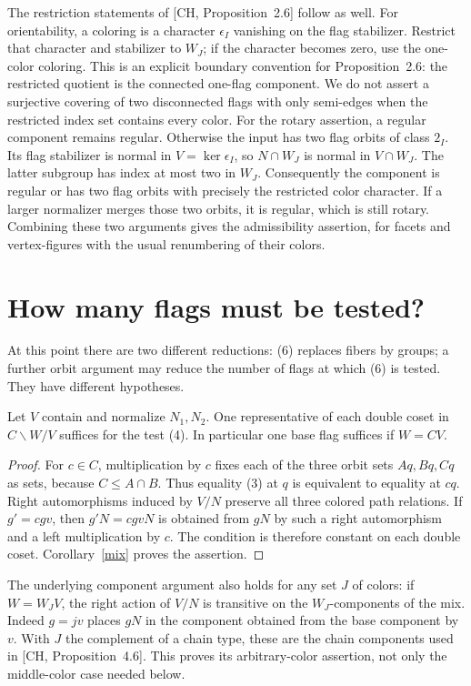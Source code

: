 \documentclass[a4paper,11pt]{article}
\begin{document}
The restriction statements of [CH, Proposition~2.6] follow as well.
For orientability, a coloring is a character $\epsilon_I$ vanishing on
the flag stabilizer. Restrict that character and stabilizer to $W_J$;
if the character becomes zero, use the one-color coloring. This is an
explicit boundary convention for Proposition~2.6: the restricted quotient
is the connected one-flag component. We do not assert a surjective covering
of two disconnected flags with only semi-edges when the restricted index
set contains every color. For the rotary assertion, a regular component remains regular. Otherwise the
input has two flag orbits of class $2_I$. Its flag stabilizer is normal
in $V=\ker\epsilon_I$, so $N\cap W_J$ is normal in $V\cap W_J$.
The latter subgroup has index at most two in $W_J$. Consequently the
component is regular or has two flag orbits with precisely the restricted
color character. If a larger normalizer merges those two orbits, it is
regular, which is still rotary. Combining these two arguments gives the
admissibility assertion, for facets and vertex-figures with the usual
renumbering of their colors.

\section{How many flags must be tested?}
At this point there are two different reductions: (6) replaces fibers
by groups; a further orbit argument may reduce the number of flags at
which (6) is tested. They have different hypotheses.

\begin{proposition}\label{orbit}
Let $V$ contain and normalize $N_1,N_2$. One representative of each
double coset in $C\backslash W/V$ suffices for the test (4).
In particular one base flag suffices if $W=CV$.
\end{proposition}
\begin{proof}
For $c\in C$, multiplication by $c$ fixes each of the three orbit sets
$Aq,Bq,Cq$ as sets, because $C\leq A\cap B$. Thus equality (3) at
$q$ is equivalent to equality at $cq$. Right automorphisms induced by
$V/N$ preserve all three colored path relations. If $g'=cgv$, then
$g'N=cgvN$ is obtained from $gN$ by such a right automorphism and a
left multiplication by $c$. The condition is therefore constant on each
double coset. Corollary~\ref{mix} proves the assertion.
\end{proof}
The underlying component argument also holds for any set $J$ of colors:
if $W=W_JV$, the right action of $V/N$ is transitive on the
$W_J$-components of the mix. Indeed $g=jv$ places $gN$ in the
component obtained from the base component by $v$. With $J$ the
complement of a chain type, these are the chain components used in
[CH, Proposition~4.6]. This proves its arbitrary-color assertion,
not only the middle-color case needed below.
\end{document}
